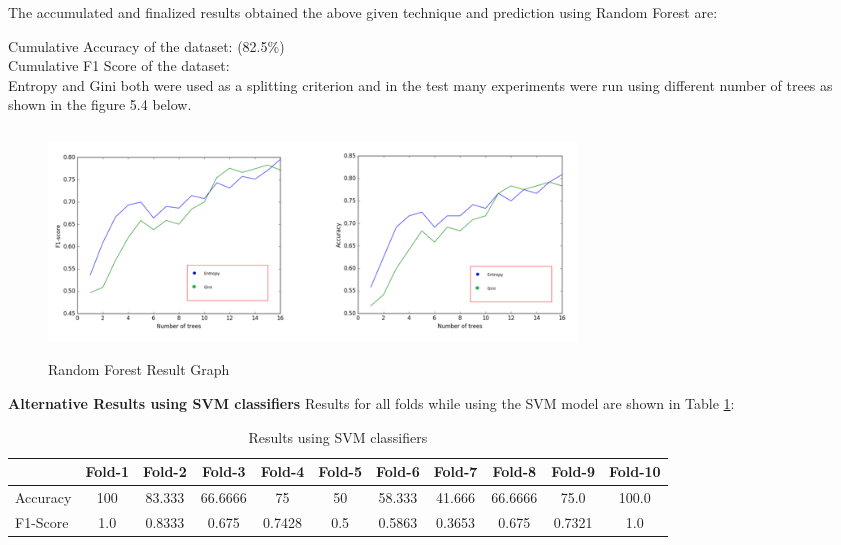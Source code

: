  

The accumulated and finalized results obtained the above given technique and prediction using Random Forest are:

 Cumulative Accuracy of the dataset:	\quad{} (82.5\%) \\
Cumulative F1 Score of the dataset:	\quad{} \\
Entropy and Gini both were used as a splitting criterion and in the test many experiments were run using different number of trees as shown in the figure 5.4 below.
\begin{figure}[!htb]
	\begin{center}
		\includegraphics[height=6cm,width=14cm]{ThesisFigs/randomforestgraph}
		\caption{Random Forest Result Graph}\label{fig:randomforestgraph}
	\end{center}
\end{figure}


\clearpage

\textbf{ Alternative Results using SVM classifiers}
\hfil \break
Results for all folds while using the SVM model are shown in Table \ref{svm}:

\begin{table}[h]
	
\begin{adjustbox}{max width=\textwidth}
	\begin{tabular}{ |p{1.7cm}|c|c|c|c|c|c|c|c|c|c|} 
		\hline
		&  Fold-1 &  Fold-2 &  Fold-3&  Fold-4&  Fold-5&  Fold-6 &  Fold-7	 &  Fold-8&  Fold-9 &  Fold-10     \\ 
		\hline
		Accuracy &  100    &  83.333   &  66.6666   &  75  &  50  &  58.333  &  41.666	 &  66.6666  &  75.0    &  100.0 \\ 
		\hline
		F1-Score & 1.0 &	0.8333 &	0.675 &	0.7428 &	0.5	& 0.5863 &	0.3653	& 0.675	& 0.7321 &	1.0 \\ 
		\hline
	\end{tabular}
\end{adjustbox}
	\caption{Results using SVM classifiers\label{svm}}
\end{table}



